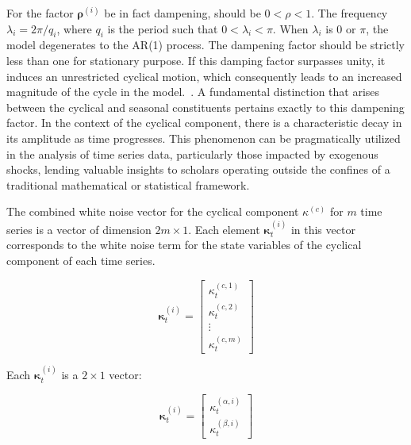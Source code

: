     For the factor $\bm{\rho}^{(i)}$ be in fact dampening, should be $ 0 < \rho < 1$.
    The frequency $\lambda_i = 2\pi/q_i $, where $q_i$ is the period such that $0 < \lambda_i < \pi$.
    When $\lambda_i$ is 0 or $\pi$, the model degenerates to the AR(1) process.
    The dampening factor should be strictly less than one for stationary purpose.
    If this damping factor surpasses unity, it induces an unrestricted cyclical motion,
    which consequently leads to an increased magnitude of the cycle in the model.~\cite{qiu_multivariate_2018}.
    A fundamental distinction that arises between the cyclical and seasonal constituents pertains exactly to this dampening factor.
    In the context of the cyclical component, there is a characteristic decay in its amplitude as time progresses.
    This phenomenon can be pragmatically utilized in the analysis of time series data,
    particularly those impacted by exogenous shocks,
    lending valuable insights to scholars operating outside the confines of a traditional mathematical or statistical framework.


    The combined white noise vector for the cyclical component $\kappa^{(c)}$ for $m$ time series is a vector of dimension $2m \times 1$.
    Each element $\bm{\kappa}_{t}^{(i)}$ in this vector corresponds to the white noise term for the state variables of the cyclical component of each time series.

    \begin{equation}
        \bm{\kappa}_{t}^{(i)}=
            \left[
                \begin{array}{c}
                    \kappa_{t}^{(c,1)} \\
                    \kappa_{t}^{(c,2)} \\
                    \vdots \\
                    \kappa_{t}^{(c,m)}
                \end{array}
            \right]
        \label{eq:cyclical_error_mv}
    \end{equation}

    Each $\bm{\kappa}_{t}^{(i)}$ is a $2 \times 1$ vector:

    \begin{equation}
        \bm{\kappa}_{t}^{(i)}=
            \left[
                \begin{array}{c}
                    \kappa_{t}^{(\alpha,i)} \\
                    \kappa_{t}^{(\beta,i)}
                \end{array}
            \right]
        \label{eq:cyclical_error}
    \end{equation}

